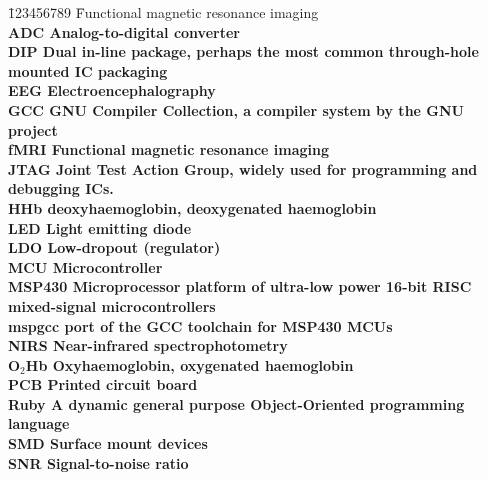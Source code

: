 
\begin{tabbing}
\quad\= 123456789 \quad\= Functional magnetic resonance imaging\kill\\

  \> \bf ADC \> Analog-to-digital converter\\
  \> \bf DIP \> Dual in-line package, perhaps the most common through-hole\\
  \> \> mounted IC packaging \\
  \> \bf EEG \> Electroencephalography \\
  \> \bf GCC  \> GNU Compiler Collection, a compiler system by the GNU project \\
  \> \bf fMRI \> Functional magnetic resonance imaging\\
  \> \bf JTAG \> Joint Test Action Group, widely used for programming and \\
  \> \> debugging ICs.\\
  \> \bf HHb \> deoxyhaemoglobin, deoxygenated haemoglobin \\
  \> \bf LED \> Light emitting diode\\
  \> \bf LDO \> Low-dropout (regulator)\\
  \> \bf MCU \> Microcontroller \\ 
  \> \bf MSP430 \> Microprocessor platform of ultra-low power 16-bit RISC \\
  \> \> mixed-signal microcontrollers \\
  \> \bf mspgcc \> port of the GCC toolchain for MSP430 MCUs\\
  \> \bf NIRS \> Near-infrared spectrophotometry \\
  \> \bf O$_{2}$Hb \> Oxyhaemoglobin, oxygenated haemoglobin\\
  \> \bf PCB \> Printed circuit board \\
  \> \bf Ruby \> A dynamic general purpose Object-Oriented programming language\\
  \> \bf SMD \> Surface mount devices\\
  \> \bf SNR \> Signal-to-noise ratio
\end{tabbing}

